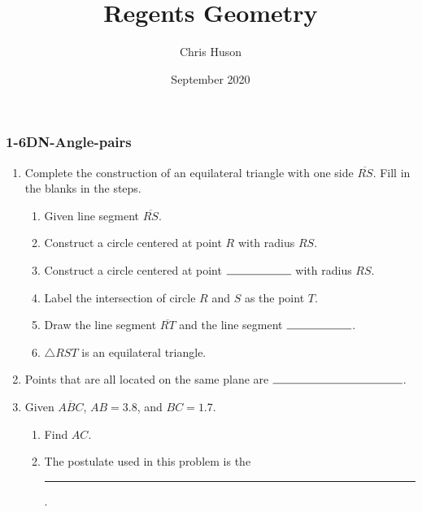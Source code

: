 \documentclass[12pt, twoside]{article}
\title{Regents Geometry}
\author{Chris Huson}
\date{September 2020}
\begin{document}
\subsubsection*{1-6DN-Angle-pairs}
\begin{enumerate}
\item Complete the construction of an equilateral triangle with one side $\overline{RS}$. Fill in the blanks in the steps.
    \begin{enumerate}
      \item Given line segment $\overline{RS}$. \bigskip
      \item Construct a circle centered at point $R$ with radius $RS$.  \bigskip
      \item Construct a circle centered at point $\rule{2cm}{0.15mm}$  with radius $RS$. \bigskip
      \item Label the intersection of circle $R$ and $S$ as the point $T$. \bigskip
      \item Draw the line segment $\overline{RT}$ and the line segment  $\rule{2cm}{0.15mm}$.
      \bigskip
      \item $\triangle RST$ is an equilateral triangle.
    \end{enumerate}
    \vspace{8cm}
    \begin{center}
    \end{center}

\newpage
\item Points that are all located on the same plane are $\rule{4cm}{0.15mm}$. \bigskip

\item Given $\overline{ABC}$, $AB=3.8$, and $BC=1.7$.
  \begin{enumerate}
    \item Find ${AC}$.\\[1.5cm]
       \vspace{2cm}
    \item The postulate used in this problem is the \rule{6cm}{0.15mm}.
  \end{enumerate}


\end{enumerate}
\end{document}
